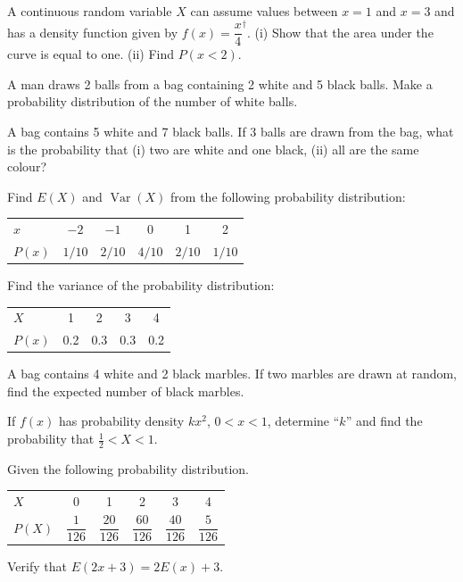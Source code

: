 \documentclass[11pt,a4paper]{article}
\begin{document}
\begin{longlist}
\item A continuous random variable $X$ can assume values between $x=1$ and $x=3$ and has a density function given by $f(x)=\dfrac{x}{4}^\dagger$. (i) Show that the area under the curve is equal to one. (ii) Find $P(x<2)$.

\item A man draws 2 balls from a bag containing 2 white and 5 black balls. Make a probability distribution of the number of white balls.

\item A bag contains 5 white and 7 black balls. If 3 balls are drawn from the bag, what is the probability that (i) two are white and one black, (ii) all are the same colour?

\item Find $E(X)$ and $\operatorname{Var}(X)$ from the following probability distribution:
\begin{center}
\begin{tabular}{l ccccc}
\toprule
$x$ & $-2$ & $-1$ & 0 & 1 & 2 \\
$P(x)$ & $1/10$ & $2/10$ & $4/10$ & $2/10$ & $1/10$ \\
\bottomrule
\end{tabular}
\end{center}

\item Find the variance of the probability distribution:
\begin{center}
\begin{tabular}{l cccc}
\toprule
$X$ & 1 & 2 & 3 & 4 \\
$P(x)$ & 0.2 & 0.3 & 0.3 & 0.2 \\
\bottomrule
\end{tabular}
\end{center}

\item A bag contains 4 white and 2 black marbles. If two marbles are drawn at random, find the expected number of black marbles.

\item If $f(x)$ has probability density $kx^2$, $0<x<1$, determine ``$k$'' and find the probability that $\tfrac{1}{2}<X<1$.

\item Given the following probability distribution.
\begin{center}
\begin{tabular}{l ccccc}
\toprule
$X$ & 0 & 1 & 2 & 3 & 4 \\
$P(X)$ & $\dfrac{1}{126}$ & $\dfrac{20}{126}$ & $\dfrac{60}{126}$ & $\dfrac{40}{126}$ & $\dfrac{5}{126}$ \\
\bottomrule
\end{tabular}
\end{center}
Verify that $E(2x+3)=2E(x)+3$.


\end{longlist}
\end{document}
